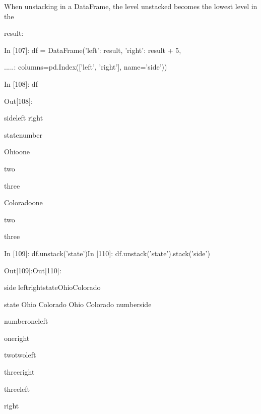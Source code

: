 \par\quad\textup When unstacking in a DataFrame, the level unstacked becomes the lowest level in the
\par\quad\textup result:
\par\quad\textup In [107]: df = DataFrame({'left': result, 'right': result + 5},
\par\quad\textup\quad .....: \quad\quad\quad columns=pd.Index(['left', 'right'], name='side'))
\par\quad\textup In [108]: df
\par\quad\textup Out[108]:
\par\quad\textup side\quad\quad\quad\quad\quad\quad\quad left right
\par\quad\textup state\quad\quad\quad number
\par\quad\textup Ohio\quad\quad\quad one\quad{}
\par\quad\textup\quad\quad\quad\quad\quad two\quad{}
\par\quad\textup\quad\quad\quad\quad\quad three\quad\xspace\xspace 2
\par\quad\textup Colorado\quad one\quad{}
\par\quad\textup\quad\quad\quad\quad\quad two\quad{}
\par\quad\quad\quad\quad\quad\quad three\xspace{}
\par\quad\textup In [109]: df.unstack('state')\quad\quad\quad\quad\quad In [110]: df.unstack('state').stack('side')
\par\quad\textup Out[109]:\quad\quad\quad\quad\quad\quad\quad\quad\quad\quad\quad\quad Out[110]:
\par\quad\textup side left\quad\quad\quad\quad\quad\quad right\quad\quad\quad\quad\quad state\quad\quad\quad\quad\quad\quad\quad Ohio\quad\quad\quad Colorado
\par\quad\textup state Ohio Colorado Ohio Colorado\quad\xspace number\quad\quad side
\par\quad\textup number\quad\quad\quad\quad\quad\quad\quad\quad\quad\quad\quad\quad\quad one\quad\quad\quad\quad left\quad\quad{}\quad\quad\quad\quad{}
\par\quad\textup one\quad{}\quad\quad{}\quad{}\quad\quad{}\quad\quad\quad\quad\quad\quad\quad\quad right\quad\quad\xspace 5\quad\quad\quad\quad{}
\par\quad\textup two\quad{}\quad\quad{}\quad{}\quad\quad{}\quad\quad\quad two\quad\quad\quad\quad left\xspace\quad{}\quad\quad\quad\quad{}
\par\quad\textup three\quad\quad{}\quad{}\quad\quad{}\quad\quad\quad\quad\quad\quad\quad\quad right\quad{}\quad\quad\quad\quad{}
\par\quad\textup\quad\quad\quad\quad\quad\quad\quad\quad\quad\quad\quad\quad\quad\quad\quad\quad three\quad\quad\quad\quad left\xspace\quad{}\quad\quad\quad\quad{}
\par\quad\textup\quad\quad\quad\quad\quad\quad\quad\quad\quad\quad\quad\quad\quad\quad\quad\quad\quad\quad\quad\quad\quad\quad right\xspace{}\quad\quad\quad\quad{}
